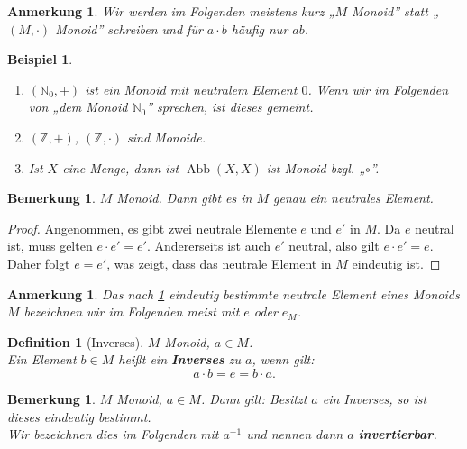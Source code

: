 \documentclass[a4paper, twoside, 11pt, ngerman]{report}
\newcommand{\NN}{\mathds N}
\newcommand{\ZZ}{\mathds Z}
\DeclareMathOperator{\Abb}{Abb}
\theoremstyle{definistyle}
\newtheorem{defini}[satz]{Definition}
\newtheorem{bem}[satz]{Bemerkung}
\newtheorem{anm}[satz]{Anmerkung}
\newtheorem{bsp}[satz]{Beispiel}
\theoremstyle{remark}
\newcommand{\defn}[1]{\textit{\bfseries #1}}
\begin{document}
\begin{anm}\label{anm:monoid_notation}
Wir werden im Folgenden meistens kurz „$ M $ Monoid” statt „$ (M, \cdot) $ Monoid” schreiben und für $ a \cdot b $ häufig nur $ ab $.
\end{anm}

\begin{bsp}\label{bsp:monoid_beispiele}
\begin{enumerate}
    \item[(a)] $ (\NN_0, +) $ ist ein Monoid mit neutralem Element $ 0 $. Wenn wir im Folgenden von „dem Monoid $ \NN_0 $” sprechen, ist dieses gemeint.
    \item[(b)] $ (\ZZ, +) $, $ (\ZZ, \cdot) $ sind Monoide.
    \item[(c)] Ist $ X $ eine Menge, dann ist $\Abb(X, X) $ ist Monoid bzgl. „$\circ$”.
\end{enumerate}
\end{bsp}

\begin{bem}\label{bem:eindeutiges_neutrales_element}
$ M $ Monoid. Dann gibt es in $ M $ genau ein neutrales Element.
\end{bem}

\begin{proof}
Angenommen, es gibt zwei neutrale Elemente $ e $ und $ e' $ in $ M $. Da $ e $ neutral ist, muss gelten $ e \cdot e' = e' $. Andererseits ist auch $ e' $ neutral, also gilt $ e \cdot e' = e $. Daher folgt $ e = e' $, was zeigt, dass das neutrale Element in $ M $ eindeutig ist.
\end{proof}


\begin{anm}\label{anm:neutrales_element}
Das nach \ref{bem:eindeutiges_neutrales_element} eindeutig bestimmte neutrale Element eines Monoids $ M $ bezeichnen wir im Folgenden meist mit $ e $ oder $ e_M $.
\end{anm}

\begin{defini}[Inverses]\label{def:inverses}
$M$ Monoid, $ a \in M $.\\
Ein Element $ b \in M $ heißt ein \defn{Inverses} zu $ a $, wenn gilt:
\[
a \cdot b = e = b \cdot a.
\]
\end{defini}

\begin{bem}\label{bem:eindeutiges_inverses}
$ M $ Monoid, $ a \in M $. Dann gilt: Besitzt $ a $ ein Inverses, so ist dieses eindeutig bestimmt.\\
Wir bezeichnen dies im Folgenden mit $ a^{-1} $ und nennen dann $ a $ \defn{invertierbar}.
\end{bem}
\end{document}

